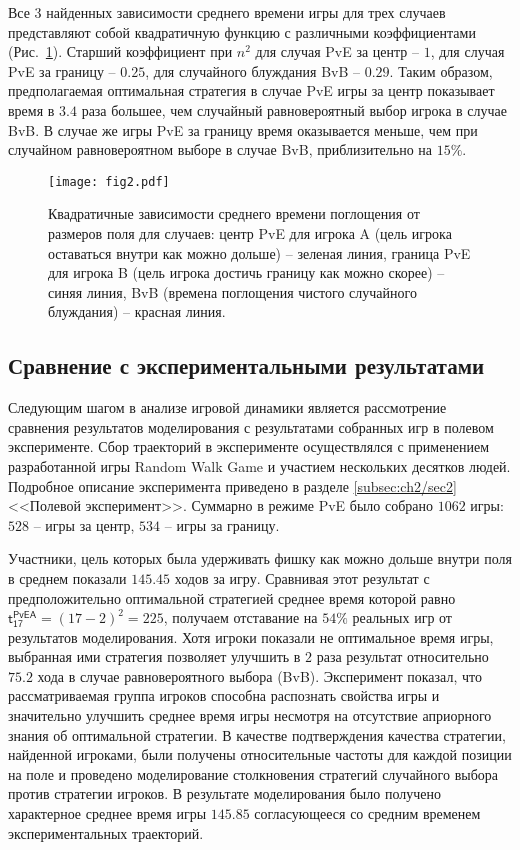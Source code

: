 Все 3 найденных зависимости среднего времени игры для трех случаев представляют собой квадратичную функцию с различными коэффициентами
(Рис.~\cref{fig:quadratic:time}).
Старший коэффициент при $n^2$ для случая PvE за центр -- $1$, для случая PvE за границу -- $0.25$, для случайного блуждания BvB -- $0.29$.
Таким образом, предполагаемая оптимальная стратегия в случае PvE игры за центр показывает время в $3.4$ раза большее, чем случайный равновероятный выбор игрока в случае BvB.
В случае же игры PvE за границу время оказывается меньше, чем при случайном равновероятном выборе в случае BvB, приблизительно на $15\%$.

\begin{figure}[t]
    \begin{center}
    \texttt{[image: fig2.pdf]}
    \caption{
        Квадратичные зависимости среднего времени поглощения от размеров поля для случаев: центр PvE для игрока A 
        (цель игрока оставаться внутри как можно дольше) -- зеленая линия, 
        граница PvE для игрока B (цель игрока достичь границу как можно скорее) -- синяя линия, 
        BvB (времена поглощения чистого случайного блуждания) -- красная линия.
    }  
    \label{fig:quadratic:time}
    \end{center}
\end{figure}


\subsection{Сравнение с экспериментальными результатами}\label{subsec:ch3/sec1/sub4}

Следующим шагом в анализе игровой динамики является рассмотрение сравнения результатов моделирования с результатами 
собранных игр в полевом эксперименте. Сбор траекторий в эксперименте осуществлялся с применением разработанной игры Random Walk Game
и участием нескольких десятков людей. Подробное описание эксперимента приведено в разделе \cref{subsec:ch2/sec2} <<Полевой эксперимент>>. Суммарно в режиме 
PvE было собрано $1062$ игры: $528$ -- игры за центр, $534$ -- игры за границу. 

Участники, цель которых была удерживать фишку как можно
дольше внутри поля в среднем показали $145.45$ ходов за игру. Сравнивая этот результат с предположительно оптимальной стратегией 
среднее время которой равно $\boldsymbol{\mathsf{t_{17}^{PvE A}}} = (17-2)^2 = 225$, получаем отставание на $54\%$ реальных игр от результатов моделирования.
Хотя игроки показали не оптимальное время игры, выбранная ими стратегия позволяет улучшить в $2$ раза результат относительно $75.2$ хода
в случае равновероятного выбора (BvB). Эксперимент показал, что рассматриваемая группа игроков способна распознать свойства игры 
и значительно улучшить среднее время игры несмотря на отсутствие априорного знания об оптимальной стратегии. 
В качестве подтверждения качества стратегии, найденной игроками, были получены относительные частоты для каждой позиции на поле
и проведено моделирование столкновения стратегий случайного выбора против стратегии игроков. В результате моделирования было получено 
характерное среднее время игры $145.85$ согласующееся со средним временем экспериментальных траекторий.

